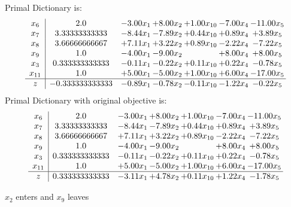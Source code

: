 \documentclass[8pt]{article}
\begin{document}
Primal Dictionary is:
\[\begin{array}{c| c c@{\hskip 2pt} c@{\hskip 2pt} c@{\hskip 2pt} c@{\hskip 2pt} c@{\hskip 2pt} }
 x_{6}   &  2.0 & -3.00 x_{1} & +  8.00 x_{2} & +  1.00 x_{10} & -7.00 x_{4} & -11.00 x_{5}\\
 x_{7}   &  3.33333333333 & -8.44 x_{1} & -7.89 x_{2} & +  0.44 x_{10} & +  0.89 x_{4} & +  3.89 x_{5}\\
 x_{8}   &  3.66666666667 & +  7.11 x_{1} & +  3.22 x_{2} & +  0.89 x_{10} & -2.22 x_{4} & -7.22 x_{5}\\
 x_{9}   &  1.0 & -4.00 x_{1} & -9.00 x_{2} &   & +  8.00 x_{4} & +  8.00 x_{5}\\
 x_{3}   &  0.333333333333 & -0.11 x_{1} & -0.22 x_{2} & +  0.11 x_{10} & +  0.22 x_{4} & -0.78 x_{5}\\
 x_{11}   &  1.0 & +  5.00 x_{1} & -5.00 x_{2} & +  1.00 x_{10} & +  6.00 x_{4} & -17.00 x_{5}\\
\hline
z    &  -0.333333333333 & -0.89 x_{1} & -0.78 x_{2} & -0.11 x_{10} & -1.22 x_{4} & -0.22 x_{5}\\
\end{array}\]
Primal Dictionary with original objective is:
\[\begin{array}{c| c c@{\hskip 2pt} c@{\hskip 2pt} c@{\hskip 2pt} c@{\hskip 2pt} c@{\hskip 2pt} }
 x_{6}   &  2.0 & -3.00 x_{1} & +  8.00 x_{2} & +  1.00 x_{10} & -7.00 x_{4} & -11.00 x_{5}\\
 x_{7}   &  3.33333333333 & -8.44 x_{1} & -7.89 x_{2} & +  0.44 x_{10} & +  0.89 x_{4} & +  3.89 x_{5}\\
 x_{8}   &  3.66666666667 & +  7.11 x_{1} & +  3.22 x_{2} & +  0.89 x_{10} & -2.22 x_{4} & -7.22 x_{5}\\
 x_{9}   &  1.0 & -4.00 x_{1} & -9.00 x_{2} &   & +  8.00 x_{4} & +  8.00 x_{5}\\
 x_{3}   &  0.333333333333 & -0.11 x_{1} & -0.22 x_{2} & +  0.11 x_{10} & +  0.22 x_{4} & -0.78 x_{5}\\
 x_{11}   &  1.0 & +  5.00 x_{1} & -5.00 x_{2} & +  1.00 x_{10} & +  6.00 x_{4} & -17.00 x_{5}\\
\hline
z    &  0.333333333333 & -3.11 x_{1} & +  4.78 x_{2} & +  0.11 x_{10} & +  1.22 x_{4} & -1.78 x_{5}\\
\end{array}\]


 $ x_{2} $ enters and $ x_{9} $ leaves 
\end{document}
